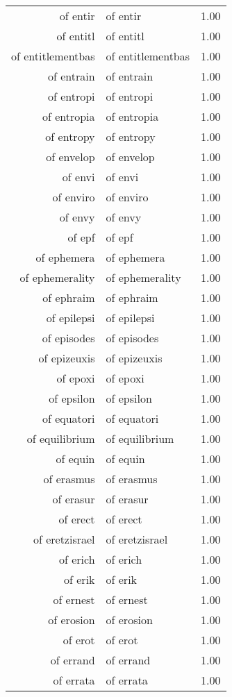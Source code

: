 \begin{table}[ht]
\begin{tabular}{rlr}
  of entir & of entir & 1.00 \\ 
  of entitl & of entitl & 1.00 \\ 
  of entitlementbas & of entitlementbas & 1.00 \\ 
  of entrain & of entrain & 1.00 \\ 
  of entropi & of entropi & 1.00 \\ 
  of entropia & of entropia & 1.00 \\ 
  of entropy & of entropy & 1.00 \\ 
  of envelop & of envelop & 1.00 \\ 
  of envi & of envi & 1.00 \\ 
  of enviro & of enviro & 1.00 \\ 
  of envy & of envy & 1.00 \\ 
  of epf & of epf & 1.00 \\ 
  of ephemera & of ephemera & 1.00 \\ 
  of ephemerality & of ephemerality & 1.00 \\ 
  of ephraim & of ephraim & 1.00 \\ 
  of epilepsi & of epilepsi & 1.00 \\ 
  of episodes & of episodes & 1.00 \\ 
  of epizeuxis & of epizeuxis & 1.00 \\ 
  of epoxi & of epoxi & 1.00 \\ 
  of epsilon & of epsilon & 1.00 \\ 
  of equatori & of equatori & 1.00 \\ 
  of equilibrium & of equilibrium & 1.00 \\ 
  of equin & of equin & 1.00 \\ 
  of erasmus & of erasmus & 1.00 \\ 
  of erasur & of erasur & 1.00 \\ 
  of erect & of erect & 1.00 \\ 
  of eretzisrael & of eretzisrael & 1.00 \\ 
  of erich & of erich & 1.00 \\ 
  of erik & of erik & 1.00 \\ 
  of ernest & of ernest & 1.00 \\ 
  of erosion & of erosion & 1.00 \\ 
  of erot & of erot & 1.00 \\ 
  of errand & of errand & 1.00 \\ 
  of errata & of errata & 1.00 \\ 

\end{tabular}
\end{table}
